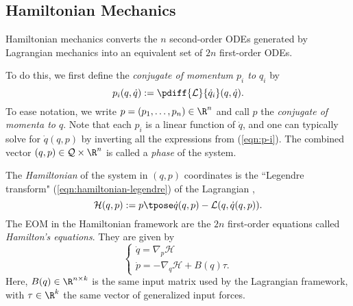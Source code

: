 \subsection{Hamiltonian Mechanics}
Hamiltonian mechanics converts the \(n\) second-order ODEs generated by
Lagrangian mechanics into an equivalent set of \(2n\) first-order ODEs.

To do this, we first define the \textit{conjugate of momentum \(p_i\) to \(q_i\)} by
\begin{equation}\label{eqn:p-i}
    p_i(q,\dot{q}) := \pdiff{\mathcal{L}}{\dot{q}_i}(q,\dot{q})
    .
\end{equation}
To ease notation, we write \(p = (p_1, \ldots, p_n) \in \R^n\) and call
\(p\) the \textit{conjugate of momenta to \(q\)}.
Note that each \(p_i\) is a linear function of \(\dot{q}\), and one can typically
solve for \(\dot{q}(q,p)\) by inverting all the expressions from (\ref{eqn:p-i}).
The combined vector \((q,p) \in \mathcal{Q}\times\R^n\) is called a 
\textit{phase} of the system. 

The \textit{Hamiltonian} of the system in
\((q,p)\) coordinates is the ``Legendre transform"
(\ref{eqn:hamiltonian-legendre}) of the Lagrangian \cite{landau_mechanics},
\begin{equation}\label{eqn:hamiltonian-legendre}
    \mathcal{H}(q,p) := p\tpose \dot{q}(q,p) - \mathcal{L}(q,\dot{q}(q,p))
    .
\end{equation}
The EOM in the Hamiltonian framework are the \(2n\)
first-order equations called \textit{Hamilton's equations}. They are given by
\begin{equation}\label{eqn:hamiltons-eqns}
    \begin{cases}
        \dot{q} = \nabla_p\mathcal{H} \\
        \dot{p} = -\nabla_q\mathcal{H} + B(q)\tau
        .
    \end{cases}
\end{equation}
Here, \(B(q) \in \R^{n\times k}\) is the same input matrix used by the
Lagrangian framework, with \(\tau \in \R^k\) the same vector of generalized
input forces.

